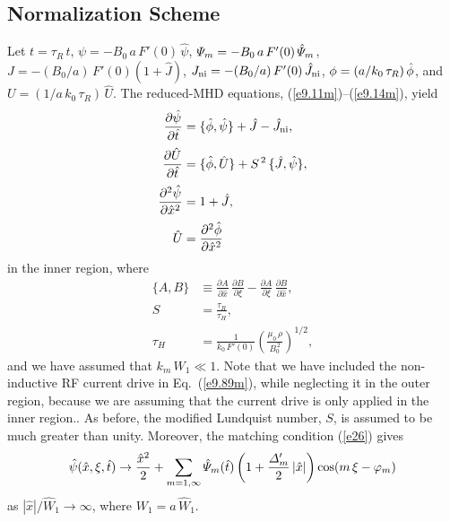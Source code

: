 \documentclass[12pt,prb,aps]{revtex4-1}
\begin{document}
\subsection{Normalization Scheme}
Let $t=\tau_R\,\hat{t}$, $\psi= -B_0\,a\,F'(0)\,\hat{\psi}$, ${\mit\Psi}_m = -B_0\,a\,F'(0)\,\hat{\mit\Psi}_m$, $J=-(B_0/a)\,F'(0)(1+\hat{J})$, $J_{\rm ni} =-(B_0/a)\,F'(0)\,\hat{J}_{\rm ni}$, $\phi= (a/k_0\,\tau_R)\,\skew{3}\hat{\phi}$, and
$U= (1/a\,k_0\,\tau_R)\,\hat{U}$. The reduced-MHD equations, (\ref{e9.11m})--(\ref{e9.14m}), yield
\begin{align}
\frac{\partial\hat{\psi}}{\partial\hat{t}}&=\{\skew{3}\hat{\phi},\hat{\psi}\}+\hat{J}-\hat{J}_{\rm ni},\label{e9.89m}\\[0.5ex]
\frac{\partial\hat{U}}{\partial\hat{t}}&= \{\skew{3}\hat{\phi},\hat{U}\}+S^{\,2}\,\{\hat{J},\hat{\psi}\},\label{e9.90}\\[0.5ex]
\frac{\partial^2\hat{\psi}}{\partial \hat{x}^2} &= 1 + \hat{J},\label{e9.91}\\[0.5ex]
\hat{U}&=\frac{\partial^2 \skew{3}\hat{\phi}}{\partial \hat{x}^2}\label{e9.92m}
\end{align}
in the inner region, 
where
\begin{align}
\{A, B\} &\equiv \frac{\partial A}{\partial\hat{x}}\,\frac{\partial B}{\partial\xi} - \frac{\partial A}{\partial\xi}\,\frac{\partial B}{\partial\hat{x}},\\[0.5ex]
S &=\frac{\tau_R}{\tau_H},\\[0.5ex]
\tau_H &= \frac{1}{k_0\,F'(0)}\left(\frac{\mu_0\,\rho}{B_0^{\,2}}\right)^{1/2},
\end{align}
and we have assumed that $k_m\,W_1\ll 1$. Note that we  have included the non-inductive RF current
drive in Eq.~(\ref{e9.89m}), while neglecting it in the outer region,  because we are assuming that the current drive is only applied in the inner region.. 
As before, the modified Lundquist number, $S$, is assumed to be much greater than unity. 
Moreover, the matching condition (\ref{e26}) gives
\begin{equation}\label{e34}
\hat{\psi}(\hat{x},\xi,\hat{t}) \rightarrow \frac{\hat{x}^2}{2}+ \sum_{m=1,\infty}\hat{\mit\Psi}_m(\hat{t})\left(1+\frac{{\mit\Delta}_m'}{2}\,|\hat{x}|\right)\cos(m\,\xi-\varphi_m)
\end{equation}
as $|\hat{x}|/\hat{W}_1\rightarrow \infty$, where $W_1=a\,\hat{W}_1$. 
\end{document}
